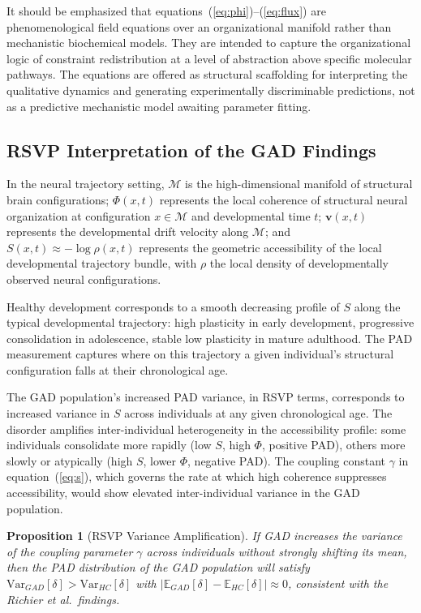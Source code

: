 \documentclass[11pt,a4paper]{article}
\theoremstyle{plain}
\newtheorem{proposition}[theorem]{Proposition}
\theoremstyle{definition}
\begin{document}
It should be emphasized that equations~(\ref{eq:phi})--(\ref{eq:flux}) are
phenomenological field equations over an organizational manifold rather than mechanistic
biochemical models. They are intended to capture the organizational logic of constraint
redistribution at a level of abstraction above specific molecular pathways. The equations
are offered as structural scaffolding for interpreting the qualitative dynamics and
generating experimentally discriminable predictions, not as a predictive mechanistic
model awaiting parameter fitting.

\subsection{RSVP Interpretation of the GAD Findings}

In the neural trajectory setting, $\mathcal{M}$ is the high-dimensional manifold of
structural brain configurations; $\Phi(x, t)$ represents the local coherence of
structural neural organization at configuration $x \in \mathcal{M}$ and developmental
time $t$; $\mathbf{v}(x, t)$ represents the developmental drift velocity along
$\mathcal{M}$; and $S(x, t) \approx -\log\rho(x,t)$ represents the geometric
accessibility of the local developmental trajectory bundle, with $\rho$ the local
density of developmentally observed neural configurations.

Healthy development corresponds to a smooth decreasing profile of $S$ along the typical
developmental trajectory: high plasticity in early development, progressive consolidation
in adolescence, stable low plasticity in mature adulthood. The PAD measurement captures
where on this trajectory a given individual's structural configuration falls at their
chronological age.

The GAD population's increased PAD variance, in RSVP terms, corresponds to increased
variance in $S$ across individuals at any given chronological age. The disorder amplifies
inter-individual heterogeneity in the accessibility profile: some individuals consolidate
more rapidly (low $S$, high $\Phi$, positive PAD), others more slowly or atypically
(high $S$, lower $\Phi$, negative PAD). The coupling constant $\gamma$ in
equation~(\ref{eq:s}), which governs the rate at which high coherence suppresses
accessibility, would show elevated inter-individual variance in the GAD population.

\begin{proposition}[RSVP Variance Amplification]
If GAD increases the variance of the coupling parameter $\gamma$ across individuals
without strongly shifting its mean, then the PAD distribution of the GAD population
will satisfy $\mathrm{Var}_{GAD}[\delta] > \mathrm{Var}_{HC}[\delta]$ with
$|\mathbb{E}_{GAD}[\delta] - \mathbb{E}_{HC}[\delta]| \approx 0$, consistent with
the Richier et al.\ findings.
\end{proposition}
\end{document}
